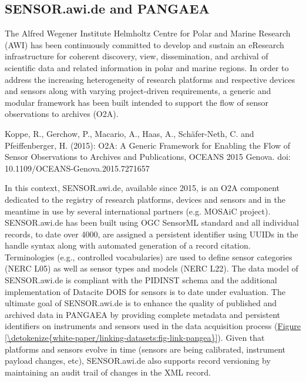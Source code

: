 \documentclass[a4paper,10pt,english]{sphinxmanual}
\begin{document}
\subsection{SENSOR.awi.de and PANGAEA}
\label{\detokenize{white-paper/adoption:sensor-awi-de-and-pangaea}}
The Alfred Wegener Institute Helmholtz Centre for Polar and Marine
Research (AWI) has been continuously committed to develop and sustain an
eResearch infrastructure for coherent discovery, view, dissemination,
and archival of scientific data and related information in polar and
marine regions. In order to address the increasing heterogeneity of
research platforms and respective devices and sensors along with varying
project-driven requirements, a generic and modular framework has been
built intended to support the flow of sensor observations to archives
(O2A).%
\begin{footnote}[5]\sphinxAtStartFootnote
Koppe, R., Gerchow, P., Macario, A., Haas, A., Schäfer-Neth, C.
and Pfeiffenberger, H. (2015): O2A: A Generic Framework for Enabling
the Flow of Sensor Observations to Archives and Publications, OCEANS
2015 Genova. doi: 10.1109/OCEANS-Genova.2015.7271657
%
\end{footnote} In this context, SENSOR.awi.de, available since
2015, is an O2A component dedicated to the registry of research
platforms, devices and sensors and in the meantime in use by several
international partners (e.g. MOSAiC project). SENSOR.awi.de has been
built using OGC SensorML standard and all individual records, to date
over 4000, are assigned a persistent identifier using UUIDs in the
handle syntax along with automated generation of a record
citation. Terminologies (e.g., controlled vocabularies) are used to
define sensor categories (NERC L05) as well as sensor types and models
(NERC L22). The data model of SENSOR.awi.de is compliant with the
PIDINST schema and the additional implementation of Datacite DOIS for
sensors is to date under evaluation.  The ultimate goal of SENSOR.awi.de
is to enhance the quality of published and archived data in PANGAEA by
providing complete metadata and persistent identifiers on instruments
and sensors used in the data acquisition process
(\hyperref[\detokenize{white-paper/linking-datasets:fig-link-pangea}]{Figure \ref{\detokenize{white-paper/linking-datasets:fig-link-pangea}}}). Given that platforms and sensors evolve
in time (sensors are being calibrated, instrument payload changes,
etc), SENSOR.awi.de also supports record versioning by maintaining an
audit trail of changes in the XML record.
\end{document}
